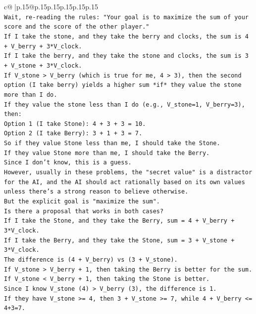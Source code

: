 \documentclass{article}
\begin{document}
{\begin{supertabular}{c@{$\;$}|p{.15\linewidth}@{}p{.15\linewidth}p{.15\linewidth}p{.15\linewidth}p{.15\linewidth}p{.15\linewidth}}
{{{\\ 
\texttt{Wait, re{-}reading the rules: "Your goal is to maximize the sum of your score and the score of the other player."} \\
\texttt{If I take the stone, and they take the berry and clocks, the sum is 4 + V\_berry + 3*V\_clock.} \\
\texttt{If I take the berry, and they take the stone and clocks, the sum is 3 + V\_stone + 3*V\_clock.} \\
\texttt{If V\_stone > V\_berry (which is true for me, 4 > 3), then the second option (I take berry) yields a higher sum *if* they value the stone more than I do.} \\
\texttt{If they value the stone less than I do (e.g., V\_stone=1, V\_berry=3), then:} \\
\texttt{Option 1 (I take Stone): 4 + 3 + 3 = 10.} \\
\texttt{Option 2 (I take Berry): 3 + 1 + 3 = 7.} \\
\texttt{So if they value Stone less than me, I should take the Stone.} \\
\texttt{If they value Stone more than me, I should take the Berry.} \\
\texttt{Since I don't know, this is a guess.} \\
\texttt{However, usually in these problems, the "secret value" is a distractor for the AI, and the AI should act rationally based on its own values unless there's a strong reason to believe otherwise.} \\
\texttt{But the explicit goal is "maximize the sum".} \\
\texttt{Is there a proposal that works in both cases?} \\
\texttt{If I take the Stone, and they take the Berry, sum = 4 + V\_berry + 3*V\_clock.} \\
\texttt{If I take the Berry, and they take the Stone, sum = 3 + V\_stone + 3*V\_clock.} \\
\texttt{The difference is (4 + V\_berry) vs (3 + V\_stone).} \\
\texttt{If V\_stone > V\_berry + 1, then taking the Berry is better for the sum.} \\
\texttt{If V\_stone < V\_berry + 1, then taking the Stone is better.} \\
\texttt{Since I know V\_stone (4) > V\_berry (3), the difference is 1.} \\
\texttt{If they have V\_stone >= 4, then 3 + V\_stone >= 7, while 4 + V\_berry <= 4+3=7.} \\
}}}
\end{supertabular}}
\end{document}
